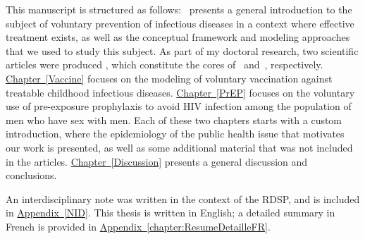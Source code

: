 This manuscript is structured as follows:~ presents a general introduction to the subject of voluntary prevention of infectious diseases in a context where effective treatment exists, as well as the conceptual framework and modeling approaches that we used to study this subject. As part of my doctoral research, two scientific articles were 
produced \cite[]{Jijon2017,Jijon2021}, which constitute the cores of~ and~, respectively. \hyperlink{Vaccine}{Chapter~\ref*{Vaccine}} focuses on the modeling of voluntary vaccination against treatable childhood infectious diseases. \hyperlink{PrEP}{Chapter~\ref*{PrEP}} focuses on the voluntary use of pre-exposure prophylaxis to avoid HIV infection among the population of men who have sex with men. Each of these two chapters starts with a custom introduction, where the epidemiology of the public health issue that motivates our work is presented, as well as some additional material that was not included in the articles. \hyperlink{Discussion}{Chapter~\ref*{Discussion}} presents a general discussion and conclusions. 

An interdisciplinary note was written in the context of the RDSP, and is included in \hyperlink{NID}{Appendix~\ref*{NID}}. This thesis is written in English; a detailed summary in French is provided in \hyperlink{chapter:ResumeDetailleFR}{Appendix~\ref*{chapter:ResumeDetailleFR}}.